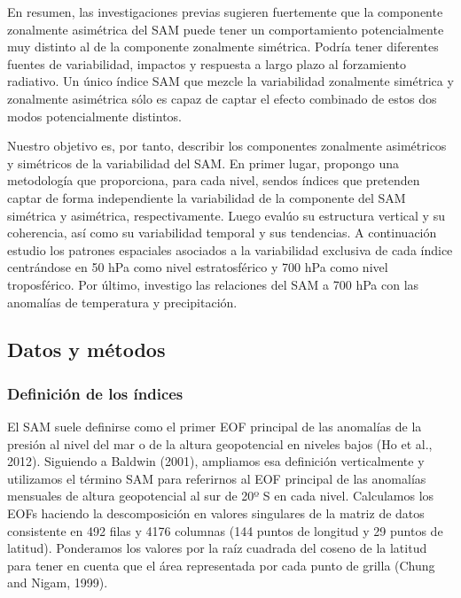 \documentclass[12pt,oneside]{reedthesis}
\begin{document}
En resumen, las investigaciones previas sugieren fuertemente que la componente zonalmente asimétrica del SAM puede tener un comportamiento potencialmente muy distinto al de la componente zonalmente simétrica.
Podría tener diferentes fuentes de variabilidad, impactos y respuesta a largo plazo al forzamiento radiativo.
Un único índice SAM que mezcle la variabilidad zonalmente simétrica y zonalmente asimétrica sólo es capaz de captar el efecto combinado de estos dos modos potencialmente distintos.

Nuestro objetivo es, por tanto, describir los componentes zonalmente asimétricos y simétricos de la variabilidad del SAM.
En primer lugar, propongo una metodología que proporciona, para cada nivel, sendos índices que pretenden captar de forma independiente la variabilidad de la componente del SAM simétrica y asimétrica, respectivamente.
Luego evalúo su estructura vertical y su coherencia, así como su variabilidad temporal y sus tendencias.
A continuación estudio los patrones espaciales asociados a la variabilidad exclusiva de cada índice centrándose en 50 hPa como nivel estratosférico y 700 hPa como nivel troposférico.
Por último, investigo las relaciones del SAM a 700 hPa con las anomalías de temperatura y precipitación.

\hypertarget{datos-y-muxe9todos-1}{%
\subsection{Datos y métodos}\label{datos-y-muxe9todos-1}}

\hypertarget{definition-of-indices}{%
\subsubsection{Definición de los índices}\label{definition-of-indices}}

El SAM suele definirse como el primer EOF principal de las anomalías de la presión al nivel del mar o de la altura geopotencial en niveles bajos (Ho et al., 2012).
Siguiendo a Baldwin (2001), ampliamos esa definición verticalmente y utilizamos el término SAM para referirnos al EOF principal de las anomalías mensuales de altura geopotencial al sur de 20º S en cada nivel.
Calculamos los EOFs haciendo la descomposición en valores singulares de la matriz de datos consistente en 492 filas y 4176 columnas (144 puntos de longitud y 29 puntos de latitud).
Ponderamos los valores por la raíz cuadrada del coseno de la latitud para tener en cuenta que el área representada por cada punto de grilla (Chung and Nigam, 1999).
\end{document}
